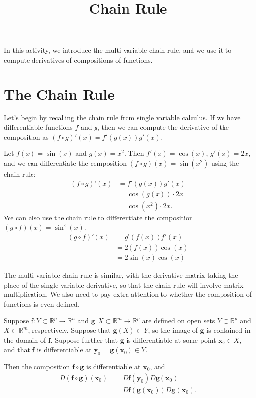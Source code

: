 \documentclass{ximera}
\title{Chain Rule}
\begin{document}
\begin{abstract}
\end{abstract}
\maketitle

In this activity, we introduce the multi-variable chain rule, and we use it to compute derivatives of compositions of functions.

\section*{The Chain Rule}

Let's begin by recalling the chain rule from single variable calculus. If we have differentiable functions $f$ and $g$, then we can compute the derivative of the composition as $(f\circ g)'(x) =f'(g(x))g'(x)$.

\begin{example}
Let $f(x) = \sin(x)$ and $g(x) = x^2$. Then $f'(x) = \cos(x)$, $g'(x)=2x$, and we can differentiate the composition $(f\circ g)(x) = \sin(x^2)$ using the chain rule:
\begin{align*}
(f\circ g)'(x) &= f'(g(x))g'(x)\\
&=\cos(g(x))\cdot 2x\\
&=\cos(x^2)\cdot 2x.
\end{align*}
We can also use the chain rule to differentiate the composition $(g\circ f)(x) = \sin^2(x)$.
\begin{align*}
(g\circ f)'(x) &= g'(f(x))f'(x)\\
&=2(f(x))\cos(x)\\
&=2\sin(x)\cos(x)
\end{align*}
\end{example}
 
 The multi-variable chain rule is similar, with the derivative matrix taking the place of the single variable derivative, so that the chain rule will involve matrix multiplication. We also need to pay extra attention to whether the composition of functions is even defined.
 
 \begin{theorem}
 Suppose $\mathbf{f}:Y\subset\mathbb{R}^p\rightarrow\mathbb{R}^n$ and $\mathbf{g}:X\subset\mathbb{R}^m\rightarrow\mathbb{R}^p$ are defined on open sets $Y\subset\mathbb{R}^p$ and $X\subset\mathbb{R}^m$, respectively. Suppose that $\mathbf{g}(X)\subset Y$, so the image of $\mathbf{g}$ is contained in the domain of $\mathbf{f}$. Suppose further that $\mathbf{g}$ is differentiable at some point $\mathbf{x}_0\in X$, and that $\mathbf{f}$ is differentiable at $\mathbf{y}_0=\mathbf{g}(\mathbf{x}_0)\in Y$.
 
 Then the composition $\mathbf{f}\circ\mathbf{g}$ is differentiable at $\mathbf{x}_0$, and 
 \begin{align*}
 D(\mathbf{f}\circ\mathbf{g})(\mathbf{x}_0) &= D\mathbf{f}(\mathbf{y}_0)D\mathbf{g}(\mathbf{x}_0)\\
 &= D\mathbf{f}(\mathbf{g}(\mathbf{x}_0))D\mathbf{g}(\mathbf{x}_0).
 \end{align*}
 \end{theorem}
 
\end{document}
